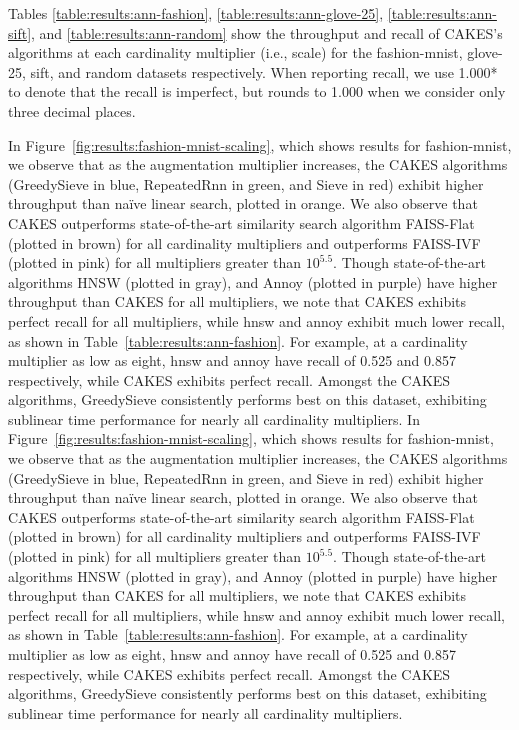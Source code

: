 Tables \ref{table:results:ann-fashion}, \ref{table:results:ann-glove-25}, \ref{table:results:ann-sift}, and \ref{table:results:ann-random} show the throughput and recall of CAKES's algorithms at each cardinality multiplier (i.e., scale) for the fashion-mnist, glove-25, sift, and random datasets respectively. When reporting recall, we use 1.000* to denote that the recall is imperfect, but rounds to 1.000 when we consider
only three decimal places.

In Figure~\ref{fig:results:fashion-mnist-scaling}, which shows results for fashion-mnist, we observe that as the augmentation multiplier increases, the CAKES algorithms (GreedySieve in blue, RepeatedRnn in green, and Sieve in red) exhibit higher throughput than na\"{i}ve linear search, plotted in orange. We also observe that CAKES outperforms state-of-the-art similarity search algorithm FAISS-Flat (plotted in brown) for all cardinality multipliers and outperforms FAISS-IVF (plotted in pink) for all multipliers greater than $10^{5.5}$. Though state-of-the-art algorithms HNSW (plotted in gray), and Annoy (plotted in purple) have higher throughput than CAKES for all multipliers, we note that CAKES exhibits perfect recall for all multipliers, while hnsw and annoy exhibit much lower recall, as shown in Table~\ref{table:results:ann-fashion}. For example, at a cardinality multiplier as low as eight, hnsw and annoy have recall of 0.525 and 0.857 respectively, while CAKES exhibits perfect recall.
Amongst the CAKES algorithms, GreedySieve consistently performs best on this dataset, exhibiting sublinear time performance for nearly all cardinality multipliers. 
In Figure~\ref{fig:results:fashion-mnist-scaling}, which shows results for fashion-mnist, we observe that as the augmentation multiplier increases, the CAKES algorithms (GreedySieve in blue, RepeatedRnn in green, and Sieve in red) exhibit higher throughput than na\"{i}ve linear search, plotted in orange. We also observe that CAKES outperforms state-of-the-art similarity search algorithm FAISS-Flat (plotted in brown) for all cardinality multipliers and outperforms FAISS-IVF (plotted in pink) for all multipliers greater than $10^{5.5}$. Though state-of-the-art algorithms HNSW (plotted in gray), and Annoy (plotted in purple) have higher throughput than CAKES for all multipliers, we note that CAKES exhibits perfect recall for all multipliers, while hnsw and annoy exhibit much lower recall, as shown in Table~\ref{table:results:ann-fashion}. For example, at a cardinality multiplier as low as eight, hnsw and annoy have recall of 0.525 and 0.857 respectively, while CAKES exhibits perfect recall.
Amongst the CAKES algorithms, GreedySieve consistently performs best on this dataset, exhibiting sublinear time performance for nearly all cardinality multipliers. 


